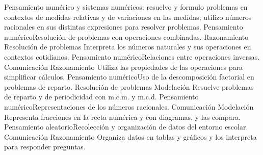 \documentclass[malla]{planeacion}
\begin{document}
\begin{malla}{Pensamiento numérico y sistemas numéricos: resuelvo y formulo problemas en contextos de medidas relativas y de variaciones en las medidas; utilizo números racionales en sus distintas expresiones para resolver problemas.}
    {Pensamiento numérico}{Resolución de problemas con operaciones combinadas.}
    {\punto Razonamiento \punto Resolución de problemas}
    {\punto Interpreta los números naturales y sus operaciones en contextos cotidianos.}
    {Pensamiento numérico}{Relaciones entre operaciones inversas.}
    {\punto Comunicación \punto Razonamiento}
    {\punto Utiliza las propiedades de las operaciones para simplificar cálculos.}
    {Pensamiento numérico}{Uso de la descomposición factorial en problemas de reparto.}
    {\punto Resolución de problemas \punto Modelación}
    {\punto Resuelve problemas de reparto y de periodicidad con m.c.m. y m.c.d.}
    {Pensamiento numérico}{Representaciones de los números racionales.}
    {\punto Comunicación \punto Modelación}
    {\punto Representa fracciones en la recta numérica y con diagramas, y las compara.}
    {Pensamiento aleatorio}{Recolección y organización de datos del entorno escolar.}
    {\punto Comunicación \punto Razonamiento}
    {\punto Organiza datos en tablas y gráficos y los interpreta para responder preguntas.}
\end{malla}
\end{document}
